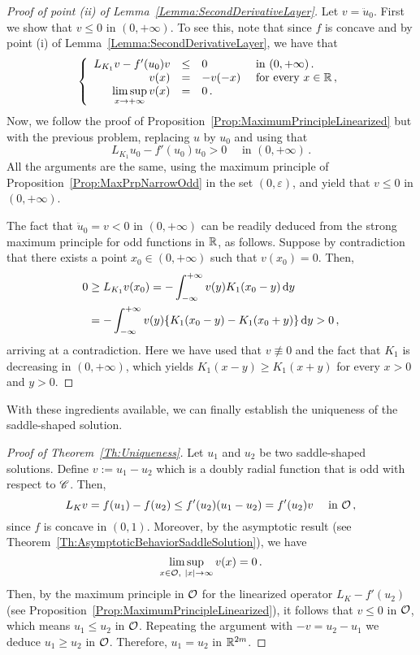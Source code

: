 \begin{proof}[Proof of point (ii) of Lemma~\ref{Lemma:SecondDerivativeLayer}]
	
	Let $v = \ddot{u}_0$. First we show that $v\leq 0$ in $(0,+\infty)$. To see this, note that since $f$ is concave and by point (i) of Lemma~\ref{Lemma:SecondDerivativeLayer}, we have that
	$$
	\left\{\begin{array}{rcll}
	L_{K_1} v - f'(u_0)v &\leq &0 & \text{ in } (0,+\infty)\,.\\
	v(x) &= &-v(-x) & \text{ for every } x\in \mathbb{R}\,,\\
	\displaystyle \limsup_{x\to +\infty} v(x) &= & 0\,.
	\end{array} \right.
	$$
	Now, we follow the proof of Proposition~\ref{Prop:MaximumPrincipleLinearized} but with the previous problem, replacing $u$ by $u_0$ and using that
	$$
	L_{K_1} u_0 - f'(u_0)u_0 > 0 \quad \text{ in } (0,+\infty)\,. 
	$$
	All the arguments are the same, using the maximum principle of Proposition~\ref{Prop:MaxPrpNarrowOdd} in the set $(0,\varepsilon)$, and yield that $v\leq 0$ in $(0,+\infty)$.
	
	The fact that $\ddot{u}_0 = v < 0$ in $(0,+\infty)$ can be readily deduced from the strong maximum principle for odd functions in $\mathbb{R}$, as follows. Suppose by contradiction that there exists a point $x_0\in (0,+\infty)$ such that $v(x_0) = 0$. Then,
	\begin{align*}
		0 &\geq L_{K_1} v (x_0) = - \int_{-\infty}^{+\infty}	v(y) K_1(x_0 - y) \,\mathrm{d} y \\
		&= - \int_{-\infty}^{+\infty} v(y) \{ K_1(x_0 - y) - K_1(x_0 + y)\} \,\mathrm{d} y > 0\,,
	\end{align*}
	arriving at a contradiction. Here we have used that $v\not \equiv 0$ and the fact that $K_1$ is decreasing in $(0,+\infty)$, which yields $K_1(x - y) \geq  K_1(x + y)$ for every $x>0$ and $y>0$.
\end{proof}






With these ingredients available, we can finally establish the uniqueness of the saddle-shaped solution.



\begin{proof}[Proof of Theorem~\ref{Th:Uniqueness}]
	Let $u_1$ and $u_2$ be two saddle-shaped solutions. Define $v := u_1 - u_2$ which is a doubly radial function that is odd with respect to $\mathscr{C}$. Then,
	$$
	L_K v = f(u_1) - f(u_2) \leq f'(u_2) (u_1 - u_2) = f'(u_2) v \quad \textrm{ in } \mathcal{O}\,,
	$$
	since $f$ is concave in $(0,1)$. Moreover, by the asymptotic result (see Theorem~\ref{Th:AsymptoticBehaviorSaddleSolution}), we have
	$$
	\limsup_{x\in \mathcal{O}, \ |x|\to \infty} v(x) = 0\,.
	$$
	Then, by the maximum principle in $\mathcal{O}$ for the linearized operator $L_K  - f'(u_2)$ (see Proposition~\ref{Prop:MaximumPrincipleLinearized}), it follows that $v \leq 0$ in $\mathcal{O}$, which means $u_1 \leq u_2$ in $\mathcal{O}$. Repeating the  argument with $-v = u_2 - u_1$ we deduce $u_1 \geq u_2$ in $\mathcal{O}$. Therefore, $u_1 = u_2$ in $\mathbb{R}^{2m}$.
\end{proof}


